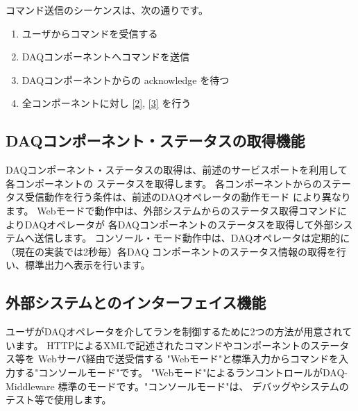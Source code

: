 \documentclass[a4j,10pt,dvips,onecolumn,oneside,final]{jarticle}%
\newcommand {\daqmwcurrent} {
	{\bf DAQ-Middleware 1.0.2}
}
\begin{document}
コマンド送信のシーケンスは、次の通りです。
\begin{enumerate}
\item ユーザからコマンドを受信する
\item DAQコンポーネントへコマンドを送信\label{2}
\item DAQコンポーネントからの acknowledge を待つ\label{3}
\item 全コンポーネントに対し \ref{2}, \ref{3} を行う
\end{enumerate}

\subsection{DAQコンポーネント・ステータスの取得機能}\label{operator-stat}
DAQコンポーネント・ステータスの取得は、前述のサービスポートを利用して各コンポーネントの
ステータスを取得します。
各コンポーネントからのステータス受信動作を行う条件は、前述のDAQオペレータの動作モード
により異なります。
Webモードで動作中は、外部システムからのステータス取得コマンドによりDAQオペレータが
各DAQコンポーネントのステータスを取得して外部システムへ送信します。
コンソール・モード動作中は、DAQオペレータは定期的に（現在の実装では2秒毎）各DAQ
コンポーネントのステータス情報の取得を行い、標準出力へ表示を行います。



\subsection{外部システムとのインターフェイス機能}\label{web-mode}
ユーザがDAQオペレータを介してランを制御するために2つの方法が用意されています。
HTTPによるXMLで記述されたコマンドやコンポーネントのステータス等を Webサーバ経由で送受信する 
"Webモード"と標準入力からコマンドを入力する"コンソールモード"です。
"Webモード"によるランコントロールがDAQ-Middleware 標準のモードです。"コンソールモード"は、
デバッグやシステムのテスト等で使用します。
\end{document}
